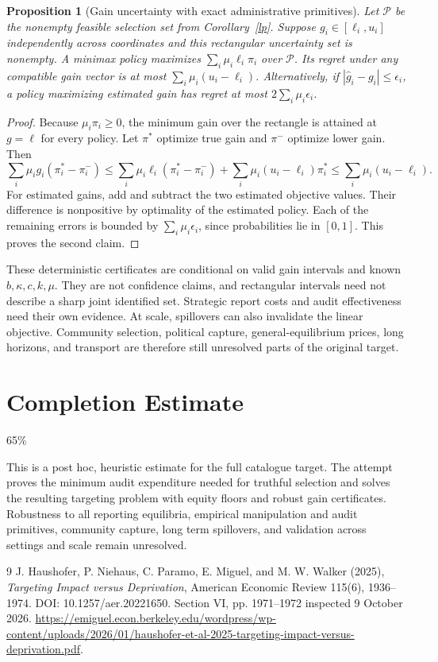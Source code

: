 \documentclass[11pt]{article}
\newtheorem{proposition}[theorem]{Proposition}
\theoremstyle{remark}
\begin{document}
\begin{proposition}[Gain uncertainty with exact administrative primitives]
Let $\mathcal P$ be the nonempty feasible selection set from Corollary~\ref{lp}. Suppose $g_i\in[\ell_i,u_i]$ independently across coordinates and this rectangular uncertainty set is nonempty. A minimax policy maximizes $\sum_i\mu_i\ell_i\pi_i$ over $\mathcal P$. Its regret under any compatible gain vector is at most $\sum_i\mu_i(u_i-\ell_i)$. Alternatively, if $|\widehat g_i-g_i|\leq\epsilon_i$, a policy maximizing estimated gain has regret at most $2\sum_i\mu_i\epsilon_i$.
\end{proposition}
\begin{proof}
Because $\mu_i\pi_i\geq0$, the minimum gain over the rectangle is attained at $g=\ell$ for every policy. Let $\pi^*$ optimize true gain and $\pi^-$ optimize lower gain. Then
\[
 \sum_i\mu_ig_i(\pi_i^*-\pi_i^-)
 \leq\sum_i\mu_i\ell_i(\pi_i^*-\pi_i^-)
       +\sum_i\mu_i(u_i-\ell_i)\pi_i^*
 \leq\sum_i\mu_i(u_i-\ell_i).
\]
For estimated gains, add and subtract the two estimated objective values. Their difference is nonpositive by optimality of the estimated policy. Each of the remaining errors is bounded by $\sum_i\mu_i\epsilon_i$, since probabilities lie in $[0,1]$. This proves the second claim.
\end{proof}

These deterministic certificates are conditional on valid gain intervals and known $b,\kappa,c,k,\mu$. They are not confidence claims, and rectangular intervals need not describe a sharp joint identified set. Strategic report costs and audit effectiveness need their own evidence. At scale, spillovers can also invalidate the linear objective. Community selection, political capture, general-equilibrium prices, long horizons, and transport are therefore still unresolved parts of the original target.

\section{Completion Estimate}
65\%

This is a post hoc, heuristic estimate for the full catalogue target.
The attempt proves the minimum audit expenditure needed for truthful selection and solves the resulting targeting problem with equity floors and robust gain certificates. Robustness to all reporting equilibria, empirical manipulation and audit primitives, community capture, long term spillovers, and validation across settings and scale remain unresolved.

\begin{thebibliography}{9}
 J. Haushofer, P. Niehaus, C. Paramo, E. Miguel, and M. W. Walker (2025), \emph{Targeting Impact versus Deprivation}, American Economic Review 115(6), 1936--1974. DOI: 10.1257/aer.20221650. Section VI, pp. 1971--1972 inspected 9 October 2026. \url{https://emiguel.econ.berkeley.edu/wordpress/wp-content/uploads/2026/01/haushofer-et-al-2025-targeting-impact-versus-deprivation.pdf}.
\end{thebibliography}
\end{document}
